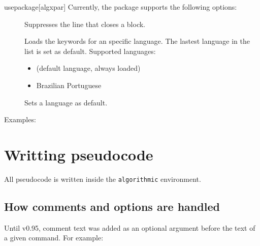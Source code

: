 \documentclass[a4paper, 11pt]{article}
\begin{document}
\begin{macro*}{usepackage}{}[algxpar]
    Currently, the package supports the following options:
    \begin{description}
        \item[] Suppresses the line that closes a block.
        \item[] Loads the keywords for an specific language. The lastest language in the list is set as default. Supported languages:
        \begin{itemize}
            \item {} (default language, always loaded)
            \item {} Brazilian Portuguese
        \end{itemize}
        \item[] Sets a language as default.
    \end{description}
\end{macro*}

Examples:
\begin{latexcode}
    \usepackage[noend]{algxpar} %

    \usepackage[brazilian]{algxpar} %

    \usepackage[brazilian, language = english]{algxpar}  %
\end{latexcode}


\section{Writting pseudocode}
All pseudocode is written inside the \texttt{algorithmic} environment.

\subsection{How comments and options are handled}
Until  v0.95, comment text was added as an optional argument before the text of a given command. For example:

\begin{tcblisting}{}
    \begin{algorithmic}
        \EndWhile
    \end{algorithmic}
\end{tcblisting}
\end{document}
